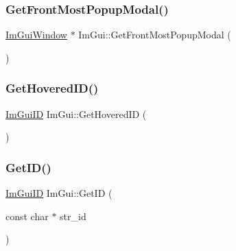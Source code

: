 \subsubsection{\texorpdfstring{Get\+Front\+Most\+Popup\+Modal()}{GetFrontMostPopupModal()}}
{\footnotesize\ttfamily \mbox{\hyperlink{struct_im_gui_window}{Im\+Gui\+Window}} $\ast$ Im\+Gui\+::\+Get\+Front\+Most\+Popup\+Modal (\begin{DoxyParamCaption}{ }\end{DoxyParamCaption})}

\mbox{\label{namespace_im_gui_ad57aba42e0eb99a7302a614ddbc363c9}} 
\subsubsection{\texorpdfstring{Get\+Hovered\+I\+D()}{GetHoveredID()}}
{\footnotesize\ttfamily \mbox{\hyperlink{imgui_8h_a1785c9b6f4e16406764a85f32582236f}{Im\+Gui\+ID}} Im\+Gui\+::\+Get\+Hovered\+ID (\begin{DoxyParamCaption}{ }\end{DoxyParamCaption})}

\mbox{\label{namespace_im_gui_a3329b04bd4235e90ad9deb00ffb38ae4}} 
\subsubsection{\texorpdfstring{Get\+I\+D()}{GetID()}\hspace{0.1cm}{\footnotesize\ttfamily [1/3]}}
{\footnotesize\ttfamily \mbox{\hyperlink{imgui_8h_a1785c9b6f4e16406764a85f32582236f}{Im\+Gui\+ID}} Im\+Gui\+::\+Get\+ID (\begin{DoxyParamCaption}\item[{const char $\ast$}]{str\+\_\+id }\end{DoxyParamCaption})}

